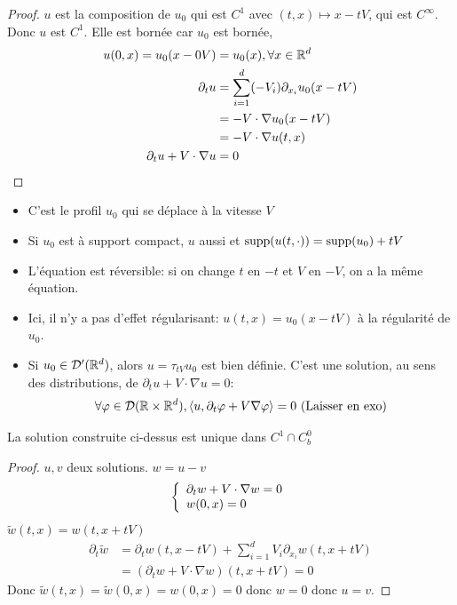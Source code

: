 \documentclass[]{report}
\begin{document}
    \begin{proof}
        $u$ est la composition de $u_0$ qui est $C^1$ avec $(t,x)\mapsto x-tV$, qui est $C^\infty$. Donc $u$ est $C^1$. Elle est bornée car $u_0$ est bornée,
        \begin{align*}
            u(0,x)=u_0(x-0V)&=u_0(x),\forall x\in \mathbb{R}^d\\
            \partial_t u&=\sum_{i=1}^{d}(-V_i)\partial_{x_i}u_0(x-tV)\\
            &=-V\cdot\nabla u_0(x-tV)\\
            &=-V\cdot \nabla u(t,x)\\
            \partial_t u+V\cdot \nabla u&=0
        \end{align*}
    \end{proof}

    \begin{re}{}{}
        \begin{itemize}
            \item C'est le profil $u_0$ qui se déplace à la vitesse $V$
            \item Si $u_0$ est à support compact, $u$ aussi et $\text{supp}(u(t,\cdot))=\text{supp}(u_0)+tV$
            \item L'équation est réversible: si on change $t$ en $-t$ et $V$ en $-V$, on a la même équation.
            \item Ici, il n'y a pas d'effet régularisant: $u(t,x)=u_0(x-tV)$ à la régularité de $u_0$.
            \item Si $u_0\in \mathcal{D}'(\mathbb{R}^d)$, alors $u=\tau_{tV}u_0$ est bien définie. C'est une solution, au sens des distributions, de $\partial_t u+V\cdot \nabla u=0$:
            \[\forall \varphi\in \mathcal{D}(\mathbb{R}\times \mathbb{R}^d),\langle u,\partial_t \varphi+V\nabla \varphi \rangle=0\text{ (Laisser en exo)}\]
        \end{itemize}
    \end{re}

    \begin{prop}{}{}
        La solution construite ci-dessus est unique dans $C^1\cap C_b^0$
    \end{prop}

    \begin{proof}
        $u,v$ deux solutions. $w=u-v$
        \[\left\{\begin{array}{ll} \partial_t w +V\cdot \nabla w=0\\ w(0,x)=0 \end{array} \right.\]
        $\tilde{w}(t,x)=w(t,x+tV)$
        \begin{align*}
            \partial_t \tilde{w}&=\partial_t w(t,x-tV)+\sum_{i=1}^{d}V_i\partial_{x_i} w(t,x+tV)\\
            &=(\partial_t w+ V\cdot\nabla w)(t,x+tV)=0
        \end{align*}
        Donc $\tilde{w}(t,x)=\tilde{w}(0,x)=w(0,x)=0$ donc $w=0$ donc $u=v$.
    \end{proof}
\end{document}
